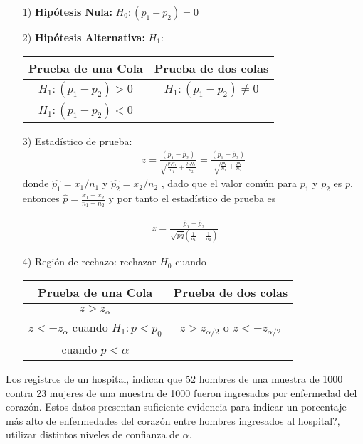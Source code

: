 \begin{frame}
\begin{frame}
\begin{itemize}
\item[1) ] \textbf{Hip\'otesis Nula:} $H_{0}:\left(p_{1}-p_{2}\right)=0$
\item[2) ] \textbf{Hip\'otesis Alternativa: } $H_{1}:$
\begin{tabular}{cc}\hline
\textbf{Prueba de una Cola} & \textbf{Prueba de dos colas}\\\hline
$H_{1}:\left(p_{1}-p_{2}\right)>0$ & $H_{1}:\left(p_{1}-p_{2}\right)\neq 0$\\ 
$H_{1}:\left(p_{1}-p_{2}\right)<0$&\\
\end{tabular}
\item[3) ] Estad\'istico de prueba:
\begin{eqnarray*}
z=\frac{\left(\hat{p}_{1}-\hat{p}_{2}\right)}{\sqrt{\frac{p_{1}q_{1}}{n_{1}}+\frac{p_{2}q_{2}}{n_{2}}}}=\frac{\left(\hat{p}_{1}-\hat{p}_{2}\right)}{\sqrt{\frac{pq}{n_{1}}+\frac{pq}{n_{2}}}}
\end{eqnarray*}
donde $\hat{p_{1}}=x_{1}/n_{1}$ y $\hat{p_{2}}=x_{2}/n_{2}$ , dado que el valor com\'un para $p_{1}$ y $p_{2}$ es $p$, entonces $\hat{p}=\frac{x_{1}+x_{2}}{n_{1}+n_{2}}$ y por tanto el estad\'istico de prueba es
\end{itemize}






\begin{eqnarray*}
z=\frac{\hat{p}_{1}-\hat{p}_{2}}{\sqrt{\hat{p}\hat{q}}\left(\frac{1}{n_{1}}+\frac{1}{n_{2}}\right)}
\end{eqnarray*}
\begin{itemize}
\item[4) ] Regi\'on de rechazo: rechazar $H_{0}$ cuando
\begin{tabular}{cc}\hline
\textbf{Prueba de una Cola} & \textbf{Prueba de dos colas}\\\hline
$z>z_{\alpha}$ & \\
$z<-z_{\alpha}$ cuando $H_{1}:p<p_{0}$&$z>z_{\alpha/2}$ o $z<-z_{\alpha/2}$\\
 cuando $p<\alpha$&\\
\end{tabular}

\end{itemize}





\begin{Ejem}
Los registros de un hospital, indican que 52 hombres de una muestra de 1000 contra 23 mujeres de una muestra de 1000 fueron ingresados por enfermedad del coraz\'on. Estos datos presentan suficiente evidencia para indicar un porcentaje m\'as alto de enfermedades del coraz\'on entre hombres ingresados al hospital?, utilizar distintos niveles de confianza de $\alpha$.


\end{Ejem}
\end{frame}
\end{frame}
